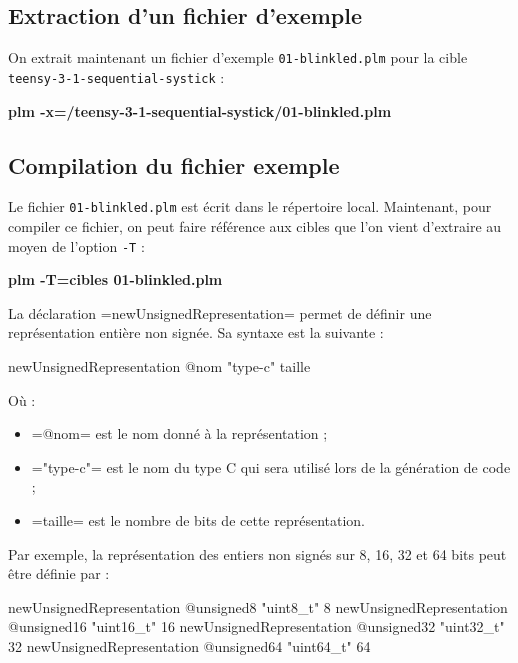 \subsection{Extraction d'un fichier d'exemple}
On extrait maintenant un fichier d'exemple \texttt{01-blinkled.plm} pour la cible \texttt{teensy-3-1-sequential-systick} :
\begin{SHELL}
\bfseries plm -x=/teensy-3-1-sequential-systick/01-blinkled.plm
\end{SHELL}

\subsection{Compilation du fichier exemple}
Le fichier \texttt{01-blinkled.plm} est écrit dans le répertoire local. Maintenant, pour compiler ce fichier, on peut faire référence aux cibles que l'on vient d'extraire au moyen de l'option \texttt{-T} :
\begin{SHELL}
\bfseries plm -T=cibles 01-blinkled.plm
\end{SHELL}




















La déclaration \plm=newUnsignedRepresentation= permet de définir une représentation entière non signée. Sa syntaxe est la suivante :


\begin{PLM}
newUnsignedRepresentation @nom "type-c" taille
\end{PLM}

Où :
\begin{itemize}
  \item \plm=@nom= est le nom donné à la représentation ;
  \item \plm="type-c"= est le nom du type C qui sera utilisé lors de la génération de code ;
  \item \plm=taille= est le nombre de bits de cette représentation.
\end{itemize}

Par exemple, la représentation des entiers non signés sur 8, 16, 32 et 64 bits peut être définie par :
\begin{PLM}
newUnsignedRepresentation @unsigned8  "uint8_t"   8
newUnsignedRepresentation @unsigned16 "uint16_t" 16
newUnsignedRepresentation @unsigned32 "uint32_t" 32
newUnsignedRepresentation @unsigned64 "uint64_t" 64
\end{PLM}








